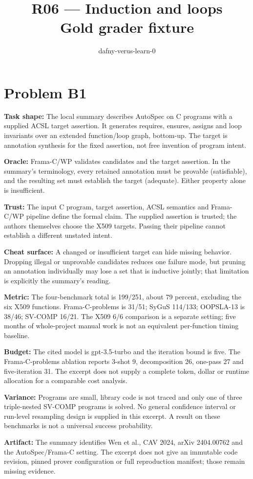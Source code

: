 \documentclass[11pt]{article}
\title{R06 --- Induction and loops \\ \large Gold grader fixture}
\author{dafny-verus-learn-0}
\date{}
\begin{document}
\maketitle
\section*{Problem B1}\label{ans:B1}
\begin{answer}
\textbf{Task shape:} The local summary describes AutoSpec on C programs with a supplied ACSL target assertion. It generates requires, ensures, assigns and loop invariants over an extended function/loop graph, bottom-up. The target is annotation synthesis for the fixed assertion, not free invention of program intent.

\textbf{Oracle:} Frama-C/WP validates candidates and the target assertion. In the summary's terminology, every retained annotation must be provable (satisfiable), and the resulting set must establish the target (adequate). Either property alone is insufficient.

\textbf{Trust:} The input C program, target assertion, ACSL semantics and Frama-C/WP pipeline define the formal claim. The supplied assertion is trusted; the authors themselves choose the X509 targets. Passing their pipeline cannot establish a different unstated intent.

\textbf{Cheat surface:} A changed or insufficient target can hide missing behavior. Dropping illegal or unprovable candidates reduces one failure mode, but pruning an annotation individually may lose a set that is inductive jointly; that limitation is explicitly the summary's reading.

\textbf{Metric:} The four-benchmark total is 199/251, about 79 percent, excluding the six X509 functions. Frama-C-problems is 31/51; SyGuS 114/133; OOPSLA-13 is 38/46; SV-COMP 16/21. The X509 6/6 comparison is a separate setting; five months of whole-project manual work is not an equivalent per-function timing baseline.

\textbf{Budget:} The cited model is gpt-3.5-turbo and the iteration bound is five. The Frama-C-problems ablation reports 3-shot 9, decomposition 26, one-pass 27 and five-iteration 31. The excerpt does not supply a complete token, dollar or runtime allocation for a comparable cost analysis.

\textbf{Variance:} Programs are small, library code is not traced and only one of three triple-nested SV-COMP programs is solved. No general confidence interval or run-level resampling design is supplied in this excerpt. A result on these benchmarks is not a universal success probability.

\textbf{Artifact:} The summary identifies Wen et al., CAV 2024, arXiv 2404.00762 and the AutoSpec/Frama-C setting. The excerpt does not give an immutable code revision, pinned prover configuration or full reproduction manifest; those remain missing evidence.
\end{answer}
\end{document}
